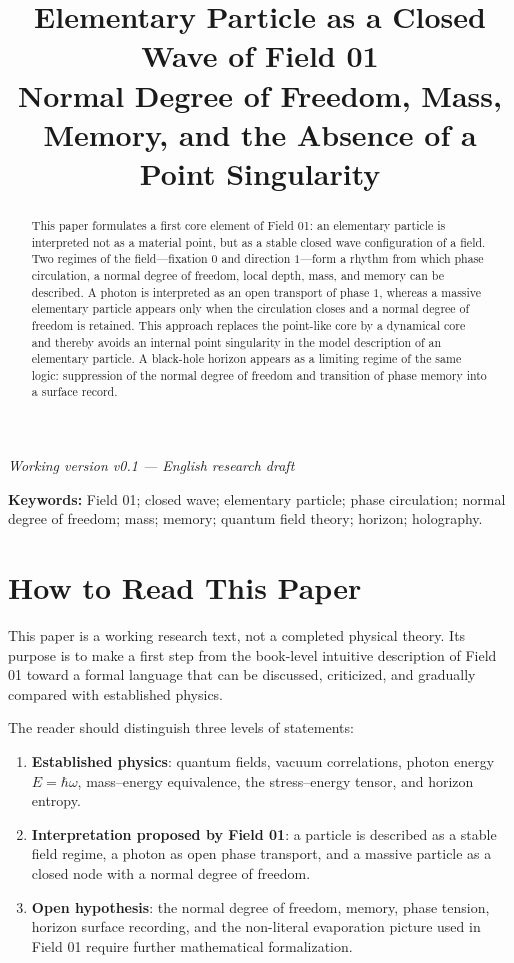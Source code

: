 \documentclass[11pt,a4paper]{article}
\title{Elementary Particle as a Closed Wave of Field 01\\\large Normal Degree of Freedom, Mass, Memory, and the Absence of a Point Singularity}
\author{}
\date{}
\begin{document}
\maketitle

\begin{center}
\textit{Working version v0.1 --- English research draft}
\end{center}

\begin{abstract}
This paper formulates a first core element of Field 01: an elementary particle is interpreted not as a material point, but as a stable closed wave configuration of a field. Two regimes of the field---fixation $0$ and direction $1$---form a rhythm from which phase circulation, a normal degree of freedom, local depth, mass, and memory can be described. A photon is interpreted as an open transport of phase $1$, whereas a massive elementary particle appears only when the circulation closes and a normal degree of freedom is retained. This approach replaces the point-like core by a dynamical core and thereby avoids an internal point singularity in the model description of an elementary particle. A black-hole horizon appears as a limiting regime of the same logic: suppression of the normal degree of freedom and transition of phase memory into a surface record.
\end{abstract}

\textbf{Keywords:} Field 01; closed wave; elementary particle; phase circulation; normal degree of freedom; mass; memory; quantum field theory; horizon; holography.

\section{How to Read This Paper}

This paper is a working research text, not a completed physical theory. Its purpose is to make a first step from the book-level intuitive description of Field 01 toward a formal language that can be discussed, criticized, and gradually compared with established physics.

The reader should distinguish three levels of statements:
\begin{enumerate}
\item \textbf{Established physics}: quantum fields, vacuum correlations, photon energy $E=\hbar\omega$, mass--energy equivalence, the stress--energy tensor, and horizon entropy.
\item \textbf{Interpretation proposed by Field 01}: a particle is described as a stable field regime, a photon as open phase transport, and a massive particle as a closed node with a normal degree of freedom.
\item \textbf{Open hypothesis}: the normal degree of freedom, memory, phase tension, horizon surface recording, and the non-literal evaporation picture used in Field 01 require further mathematical formalization.
\end{enumerate}
\end{document}
